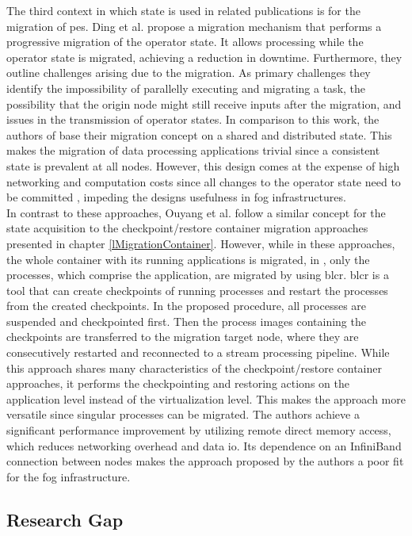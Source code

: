 The third context in which state is used in related publications is for the migration of \gls{pe}s. Ding et al. \cite{Ding.15012015} propose a migration mechanism that performs a progressive migration of the operator state. It allows processing while the operator state is migrated, achieving a reduction in downtime. Furthermore, they outline challenges arising due to the migration. As primary challenges they identify the impossibility of parallelly executing and migrating a task, the possibility that the origin node might still receive inputs after the migration, and issues in the transmission of operator states. In comparison to this work, the authors of \cite{Power.2010} base their migration concept on a shared and distributed state. This makes the migration of data processing applications trivial since a consistent state is prevalent at all nodes. However, this design comes at the expense of high networking and computation costs since all changes to the operator state need to be committed \cite{Ding.15012015}, impeding the designs usefulness in fog infrastructures.\\
In contrast to these approaches, Ouyang et al. \cite{Ouyang.2011} follow a similar concept for the state acquisition to the checkpoint/restore container migration approaches presented in chapter \ref{lMigrationContainer}. However, while in these approaches, the whole container with its running applications is migrated, in \cite{Ouyang.2011}, only the processes, which comprise the application, are migrated by using \gls{blcr}. \gls{blcr} is a tool that can create checkpoints of running processes and restart the processes from the created checkpoints. In the proposed procedure, all processes are suspended and checkpointed first. Then the process images containing the checkpoints are transferred to the migration target node, where they are consecutively restarted and reconnected to a stream processing pipeline. While this approach shares many characteristics of the checkpoint/restore container approaches, it performs the checkpointing and restoring actions on the application level instead of the virtualization level. This makes the approach more versatile since singular processes can be migrated. The authors achieve a significant performance improvement by utilizing remote direct memory access, which reduces networking overhead and data \gls{io}. Its dependence on an InfiniBand connection between nodes makes the approach proposed by the authors a poor fit for the fog infrastructure.

\subsection{Research Gap}
\label{lResearchGap}

